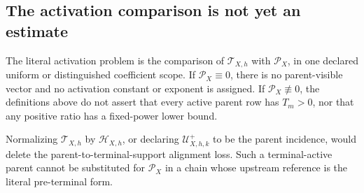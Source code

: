 \subsection{The activation comparison is not yet an estimate}

The literal activation problem is the comparison of
\(\mathcal T_{X,h}\) with \(\mathcal P_X\), in one declared uniform or
distinguished coefficient scope.  If \(\mathcal P_X\equiv0\), there is no
parent-visible vector and no activation constant or exponent is assigned.
If \(\mathcal P_X\not\equiv0\), the definitions above do not assert that
every active parent row has \(T_m>0\), nor that any positive ratio has a
fixed-power lower bound.

Normalizing \(\mathcal T_{X,h}\) by
\(\mathcal H_{X,h}\), or declaring
\(\mathcal U_{X,h,k}^{+}\) to be the parent incidence, would delete the
parent-to-terminal-support alignment loss.  Such a terminal-active parent
cannot be substituted for \(\mathcal P_X\) in a chain whose upstream
reference is the literal pre-terminal form.
